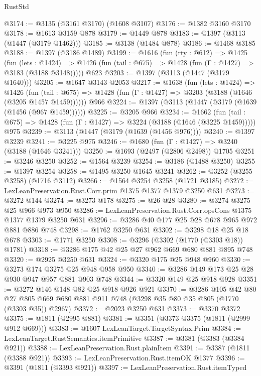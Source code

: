 \begin{lexlean}{RustStd}
\begin{coremodule}
@3174 := @3135 (@3161 @3170) (@1608 @3107)
@3176 := @1382 @3160 @3170
@3178 := @1613 @3159 @878
@3179 := @1449 @878
@3183 := @1397 (@3113 (@1447 (@3179 @1462)))
@3185 := @3138 (@1484 @878)
@3186 := @1468 @3185
@3188 := @1397 (@3186 @1489)
@3199 := @1616
    (fun (rty : @612) =>
    @1425
      (fun (lets : @1424) =>
      @1426 (fun (tail : @675) => @1428 (fun (Γ : @1427) => @3183 (@3188 @3148)))))
    @623
@3203 := @1397 (@3113 (@1447 (@3179 @1640)))
@3205 := @1647 @3143 @2053
@3217 := @1638
    (fun (lets : @1424) =>
    @1426
      (fun (tail : @675) => @1428 (fun (Γ : @1427) => @3203 (@3188 (@1646 (@3205 @1457 @1459))))))
    @966
@3224 := @1397 (@3113 (@1447 (@3179 (@1639 (@1456 (@967 @1459))))))
@3225 := @3205 @966
@3234 := @1662
    (fun (tail : @675) => @1428 (fun (Γ : @1427) => @3224 (@3188 (@1646 (@3225 @1459)))))
    @975
@3239 := @3113 (@1447 (@3179 (@1639 (@1456 @976))))
@3240 := @1397 @3239
@3241 := @3225 @975
@3246 := @1680 (fun (Γ : @1427) => @3240 (@3188 (@1646 @3241)))
@3250 := @1693 (@2497 (@2806 @2498)) @1705
@3251 := @3246 @3250
@3252 := @1564 @3239
@3254 := @3186 (@1488 @3250)
@3255 := @1397 @3254
@3258 := @1495 @3250 @1645 @3241
@3262 := @3252 (@3255 @3258) (@1716 @3112)
@3266 := @1564 @3254 @3258 (@1721 @3185)
@3272 := LexLeanPreservation.Rust.Corr.prim @1375 @1377 @1379 @3250 @631
@3273 := @3272 @144
@3274 := @3273 @178
@3275 := @26 @28
@3280 := @3274 @3275 @25 @966 @973 @950
@3286 := LexLeanPreservation.Rust.Corr.opsCons @1375 @1377 @1379 @3250 @631
@3296 := @3286 @40 @177 @25 @28 @678 @965 @972 @881 @886 @748
@3298 := @1762 @3250 @631
@3302 := @3298 @18 @25 @18 @678
@3303 := @1771 @3250
@3308 := @3296 (@3302 (@1770 (@3303 @18)) @1781)
@3318 := @3286 @175 @42 @25 @27 @962 @669 @680 @881 @895 @748
@3320 := @2925 @3250 @631
@3324 := @3320 @175 @25 @948 @960
@3330 := @3273 @174 @3275 @25 @948 @958 @950
@3340 := @3286 @149 @173 @25 @28 @930 @947 @957 @881 @903 @748
@3344 := @3320 @149 @25 @918 @928
@3351 := @3272 @146 @148 @82 @25 @918 @926 @921
@3370 := @3286
    @105
    @42
    @80
    @27
    @805
    @669
    @680
    @881
    @911
    @748
    (@3298 @35 @80 @35 @805 (@1770 (@3303 @35)) @2967)
@3372 := @2023 @3250 @631
@3373 := @3370 @3372
@3375 := @1811 (@2995 @881)
@3381 := @3351 (@3373 @3375 (@1811 (@2999 @912 @669)))
@3383 := @1607 LexLeanTarget.TargetSyntax.Prim
@3384 := LexLeanTarget.RustSemantics.itemPrimitive
@3387 := @3381 (@3383 (@3384 @921))
@3388 := LexLeanPreservation.Rust.plainItem
@3391 := @3387 (@1811 (@3388 @921))
@3393 := LexLeanPreservation.Rust.itemOK @1377
@3396 := @3391 (@1811 (@3393 @921))
@3397 := LexLeanPreservation.Rust.itemTyped

\end{coremodule}
\end{lexlean}
